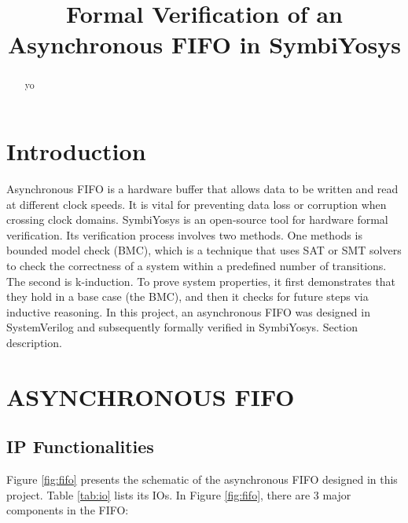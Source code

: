 \documentclass[conference]{IEEEtran}
\begin{document}
\title{Formal Verification of an Asynchronous FIFO in SymbiYosys}

\author{
}

\maketitle

\begin{abstract}
    yo
 \end{abstract}
 
 
\section{Introduction}
Asynchronous FIFO is a hardware buffer that allows data to be written and read at different clock speeds. It is vital for preventing data loss or corruption when crossing clock domains. SymbiYosys is an open-source tool for hardware formal verification. Its verification process involves two methods. One methods is bounded model check (BMC), which is a technique that uses SAT or SMT solvers to check the correctness of a system within a predefined number of transitions. The second is k-induction. To prove system properties, it first demonstrates that they hold in a base case (the BMC), and then it checks for future steps via inductive reasoning. In this project, an asynchronous FIFO was designed in SystemVerilog and subsequently formally verified in SymbiYosys. Section description.
 
\section{ASYNCHRONOUS FIFO}
\subsection{IP Functionalities}
Figure \ref{fig:fifo} presents the schematic of the asynchronous FIFO designed in this project. Table \ref{tab:io} lists its IOs. In Figure \ref{fig:fifo}, there are 3 major components in the FIFO:
\end{document}
